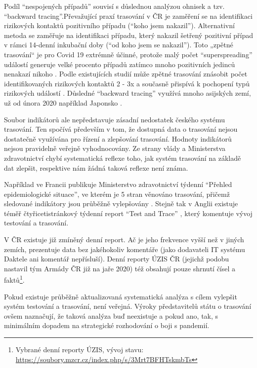 Podíl “nespojených případů” souvisí s důslednou analýzou ohnisek a tzv. “backward tracing”.Převažující praxí trasování v ČR je zaměření se na identifikaci rizikových kontaktů pozitivního případu (“koho jsem nakazil”). Alternativní metoda se zaměřuje na identifikaci případu, který nakazil šetřený pozitivní případ v rámci 14-denní inkubační doby (“od koho jsem se nakazil”). Toto „zpětné trasování“ je pro Covid 19 extrémně účinné, protože malý počet “superspreading” událostí generuje velké procento případů zatímco mnoho pozitivních jedinců nenakazí nikoho \cite{tr_adam_clustering_2020}. Podle existujících studií může zpětné trasování znásobit počet identifikovaných rizikových kontaktů 2 - 3x a současně přispívá k pochopení typů rizikových událostí \cite{tr_Endo}. Důsledné “backward tracing” využívá mnoho asijských zemí, už od února 2020 například Japonsko \cite{tr_Loh}.

Soubor indikátorů ale nepředstavuje zásadní nedostatek českého systému trasování. Ten spočívá především v tom, že dostupná data o trasování nejsou dostatečně využívána pro řízení a zlepšování trasování. Hodnoty indikátorů nejsou pravidelně veřejně vyhodnocovány. Ze strany vlády a Ministerstva zdravotnictví chybí systematická reflexe toho, jak systém trasování na základě dat zlepšit, respektive nám žádná taková reflexe není známa.

Například ve Francii publikuje Ministerstvo zdravotnictví týdenní “Přehled epidemiologické situace”, ve kterém je 5 stran věnováno trasování, přičemž sledované indikátory jsou průběžně vylepšovány \cite{tr_france}. Stejně tak v Anglii existuje téměř čtyřicetistránkový týdenní report “Test and Trace” \cite{tr_gov_uk}, který komentuje vývoj testování a trasování.

V ČR existuje již zmíněný denní report. Ač je jeho frekvence vyšší než v jiných zemích, prezentuje data bez jakéhokoliv komentáře (jako dodavateli IT systému Daktele ani komentář nepřísluší). Denní reporty ÚZIS ČR (jejichž podobu nastavil tým Armády ČR již na jaře 2020) též obsahují pouze shrnutí čísel a faktů\footnote{Vybrané denní reporty ÚZIS, vývoj stavu: \url{https://soubory.mzcr.cz/index.php/s/3Mrt7BFHTskmbTs}}.

Pokud existuje průběžně aktualizovaná systematická analýza s cílem vylepšit systém testování a trasování, není veřejná. Výroky představitelů státu o trasování ovšem naznačují, že taková analýza buď neexistuje a pokud ano, tak, s minimálním dopadem na strategické rozhodování o boji s pandemií.


